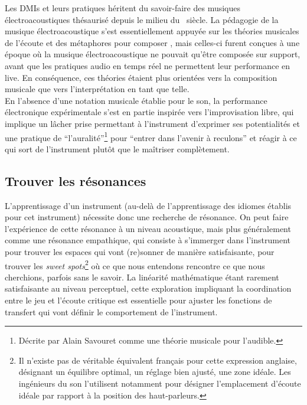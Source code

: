\noindent Les \glspl{DMI} et leurs pratiques héritent du savoir-faire des musiques électroacoustiques thésaurisé depuis le milieu du ~siècle. La pédagogie de la musique électroacoustique s'est essentiellement appuyée sur les théories musicales de l'écoute \cite{schaeffer_traite_1966} et des métaphores pour composer \cite{bayle_musique_1993}, mais celles-ci furent conçues à une époque où la musique électroacoustique ne pouvait qu'être composée sur support, avant que les pratiques audio en temps réel ne permettent leur performance en live. En conséquence, ces théories étaient plus orientées vers la composition musicale que vers l'interprétation en tant que telle.\\
\indent En l'absence d'une notation musicale établie pour le son, la performance électronique expérimentale s'est en partie inspirée vers l'improvisation libre, qui implique un lâcher prise permettant à l'instrument d'exprimer ses potentialités et une pratique de ``l'auralité''\footnote{Décrite par Alain Savouret comme une théorie musicale pour l'audible.} pour ``entrer dans l'avenir à reculons'' \cite{savouret_introduction_2010} et réagir à ce qui sort de l'instrument plutôt que le maîtriser complètement. 

\subsection{Trouver les résonances}

\noindent L'apprentissage d'un instrument (au-delà de l'apprentissage des idiomes établis pour cet instrument) nécessite donc une recherche de résonance. On peut faire l'expérience de cette résonance à un niveau acoustique, mais plus généralement comme une résonance empathique, qui consiste à s'immerger dans l'instrument pour trouver les espaces qui vont (re)sonner de manière satisfaisante, pour trouver les \textit{sweet spots}\footnote{Il n'existe pas de véritable équivalent français pour cette expression anglaise, désignant un équilibre optimal, un réglage bien ajusté, une zone idéale. Les ingénieurs du son l'utilisent notamment pour désigner l'emplacement d'écoute idéale par rapport à la position des haut-parleurs.} où ce que nous entendons rencontre ce que nous cherchions, parfois sans le savoir. La linéarité mathématique étant rarement satisfaisante au niveau perceptuel, cette exploration impliquant la coordination entre le jeu et l'écoute critique est essentielle pour ajuster les fonctions de transfert qui vont définir le comportement de l'instrument.

